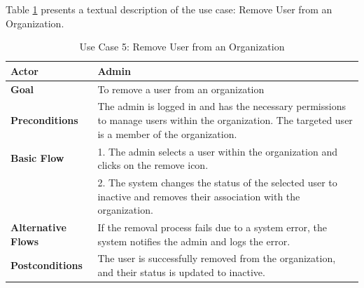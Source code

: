 Table \ref{tab:Use Case 5 Remove User from an Organization} presents a textual description of the use case: Remove User from an Organization.
\begin{table}[ht]
	\centering
	\begin{tabularx}{\textwidth}{|l|X|}
		\hline
		\textbf{Actor}             & Admin                                                                                                                                        \\
		\hline
		\textbf{Goal}              & To remove a user from an organization                                                                                                        \\
		\hline
		\textbf{Preconditions}     & The admin is logged in and has the necessary permissions to manage users within the organization. The targeted user is a member of the organization. \\
		\hline
		\textbf{Basic Flow}        & 1. The admin selects a user within the organization and clicks on the remove icon.                                                           \\
		                           & 2. The system changes the status of the selected user to inactive and removes their association with the organization.                       \\
		\hline
		\textbf{Alternative Flows} & If the removal process fails due to a system error, the system notifies the admin and logs the error.                                      \\
		\hline    
		\textbf{Postconditions}    & The user is successfully removed from the organization, and their status is updated to inactive.                                             \\
		\hline
	\end{tabularx}
	\caption{Use Case 5: Remove User from an Organization}
	\label{tab:Use Case 5 Remove User from an Organization}
\end{table}
